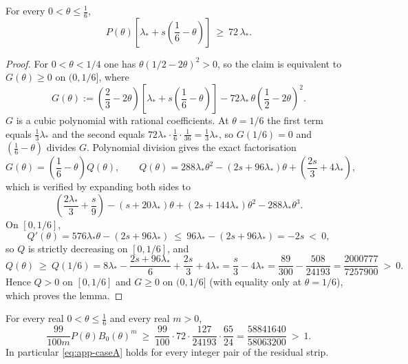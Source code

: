 \begin{lemma}\label{lem:app-cubic}
For every $0<\theta\le\frac16$,
\[
        P(\theta)\left[\lambda_*+s\left(\frac16-\theta\right)\right]
        \ \ge\ 72\,\lambda_* .
\]
\end{lemma}

\begin{proof}
For $0<\theta<1/4$ one has $\theta(1/2-2\theta)^2>0$, so the claim is
equivalent to $G(\theta)\ge0$ on $(0,1/6]$, where
\[
        G(\theta)
        :=\left(\frac23-2\theta\right)
        \left[\lambda_*+s\left(\frac16-\theta\right)\right]
        -72\lambda_*\,\theta\left(\frac12-2\theta\right)^2 .
\]
$G$ is a cubic polynomial with rational coefficients.  At $\theta=1/6$ the
first term equals $\frac13\lambda_*$ and the second equals
$72\lambda_*\cdot\frac16\cdot\frac1{36}=\frac13\lambda_*$, so $G(1/6)=0$ and
$\left(\frac16-\theta\right)$ divides $G$.  Polynomial division gives the
exact factorisation
\begin{equation}\label{eq:app-G-factor}
        G(\theta)=\left(\frac16-\theta\right)Q(\theta),
        \qquad
        Q(\theta)
        =288\lambda_*\theta^2-(2s+96\lambda_*)\theta
        +\left(\frac{2s}3+4\lambda_*\right),
\end{equation}
which is verified by expanding both sides to
\[
        \left(\frac{2\lambda_*}3+\frac s9\right)
        -\left(s+20\lambda_*\right)\theta
        +\left(2s+144\lambda_*\right)\theta^2
        -288\lambda_*\theta^3 .
\]
On $[0,1/6]$,
\[
        Q'(\theta)=576\lambda_*\theta-(2s+96\lambda_*)
        \ \le\ 96\lambda_*-(2s+96\lambda_*)=-2s\ <\ 0,
\]
so $Q$ is strictly decreasing on $[0,1/6]$, and
\begin{equation}\label{eq:app-Q-endpoint}
        Q(\theta)\ \ge\ Q(1/6)
        =8\lambda_*-\frac{2s+96\lambda_*}{6}+\frac{2s}3+4\lambda_*
        =\frac s3-4\lambda_*
        =\frac{89}{300}-\frac{508}{24193}
        =\frac{2000777}{7257900}\ >\ 0 .
\end{equation}
Hence $Q>0$ on $[0,1/6]$ and $G\ge0$ on $(0,1/6]$ (with equality only at
$\theta=1/6$), which proves the lemma.
\end{proof}

\begin{proposition}\label{prop:app-caseA-full}
For every real $0<\theta\le\frac16$ and every real $m>0$,
\[
        \frac{99}{100m}P(\theta)B_0(\theta)^m\ \ge\
        \frac{99}{100}\cdot72\cdot\frac{127}{24193}\cdot\frac{65}{24}
        =\frac{58841640}{58063200}\ >\ 1 .
\]
In particular \eqref{eq:app-caseA} holds for every integer pair of the
residual strip.
\end{proposition}

